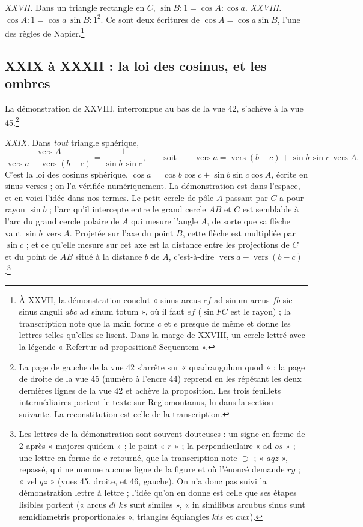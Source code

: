 \documentclass[11pt,a4paper]{article}
\begin{document}
\emph{XXVII.} Dans un triangle rectangle en $C$,
$\sin B : 1 = \cos A : \cos a$. \emph{XXVIII.}
$\cos A : 1 = \cos a\,\sin B : 1^2$. Ce sont deux écritures de
$\cos A = \cos a\sin B$, l'une des règles de Napier.\footnote{À XXVII, la
démonstration conclut « sinus arcus $cf$ ad sinum arcus $fb$ sic sinus anguli
$abc$ ad sinum totum », où il faut $ef$ ($\sin FC$ est le rayon) ; la transcription
note que la main forme $c$ et $e$ presque de même et donne les lettres telles
qu'elles se lisent. Dans la marge de XXVIII, un cercle lettré avec la légende
« Refertur ad propositionẽ Sequentem ».}

\subsection*{XXIX à XXXII : la loi des cosinus, et les ombres}

La démonstration de XXVIII, interrompue au bas de la vue 42, s'achève à la vue
45.\footnote{La page de gauche de la vue 42 s'arrête sur « quadrangulum quod » ;
la page de droite de la vue 45 (numéro à l'encre 44) reprend en les répétant les
deux dernières lignes de la vue 42 et achève la proposition. Les trois feuillets
intermédiaires portent le texte sur Regiomontanus, lu dans la section suivante.
La reconstitution est celle de la transcription.}

\emph{XXIX.} Dans \emph{tout} triangle sphérique,
\[
\frac{\operatorname{vers} A}{\operatorname{vers} a - \operatorname{vers}(b-c)}
= \frac{1}{\sin b\,\sin c},
\qquad\text{soit}\qquad
\operatorname{vers} a = \operatorname{vers}(b-c) + \sin b\,\sin c\,\operatorname{vers} A .
\]
C'est la loi des cosinus sphérique, $\cos a = \cos b\cos c + \sin b\sin c\cos A$,
écrite en sinus verses ; on l'a vérifiée numériquement. La démonstration est dans
l'espace, et en voici l'idée dans nos termes. Le petit cercle de pôle $A$ passant
par $C$ a pour rayon $\sin b$ ; l'arc qu'il intercepte entre le grand cercle $AB$
et $C$ est semblable à l'arc du grand cercle polaire de $A$ qui mesure l'angle
$A$, de sorte que sa flèche vaut $\sin b\,\operatorname{vers} A$. Projetée sur
l'axe du point $B$, cette flèche est multipliée par $\sin c$ ; et ce qu'elle
mesure sur cet axe est la distance entre les projections de $C$ et du point de
$AB$ situé à la distance $b$ de $A$, c'est-à-dire
$\operatorname{vers} a - \operatorname{vers}(b-c)$.\footnote{Les lettres de la
démonstration sont souvent douteuses : un signe en forme de 2 après « majores
quidem » ; le point « $r$ » ; la perpendiculaire « ad $os$ » ; une lettre en forme
de c retourné, que la transcription note $\supset$ ; « $aqz$ », repassé, qui ne
nomme aucune ligne de la figure et où l'énoncé demande $ry$ ; « vel $qz$ » (vues
45, droite, et 46, gauche). On n'a donc pas suivi la démonstration lettre à
lettre ; l'idée qu'on en donne est celle que ses étapes lisibles portent
(« arcus $dl$ $ks$ sunt similes », « in similibus arcubus sinus sunt semidiametris
proportionales », triangles équiangles $kts$ et $aux$).}
\end{document}
